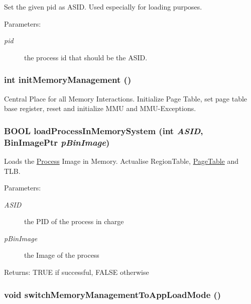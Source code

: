 Set the given pid as ASID. Used especially for loading purposes. \begin{Desc}
\item[Parameters:]
\begin{description}
\item[{\em pid}]the process id that should be the ASID. \end{description}
\end{Desc}
\hypertarget{group___v_m_m_g243fac608384b4b91246e465a206e72d}{
\subsubsection[{initMemoryManagement}]{\setlength{\rightskip}{0pt plus 5cm}int initMemoryManagement ()}}
\label{group___v_m_m_g243fac608384b4b91246e465a206e72d}


Central Place for all Memory Interactions. Initialize Page Table, set page table base register, reset and initialize MMU and MMU-Exceptions. \hypertarget{group___v_m_m_gfbd1dbe50bf30f665f1a4fc181655778}{
\subsubsection[{loadProcessInMemorySystem}]{\setlength{\rightskip}{0pt plus 5cm}BOOL loadProcessInMemorySystem (int {\em ASID}, \/  BinImagePtr {\em pBinImage})}}
\label{group___v_m_m_gfbd1dbe50bf30f665f1a4fc181655778}


Loads the \hyperlink{struct_process}{Process} Image in Memory. Actualise RegionTable, \hyperlink{struct_page_table}{PageTable} and TLB. \begin{Desc}
\item[Parameters:]
\begin{description}
\item[{\em ASID}]the PID of the process in charge \item[{\em pBinImage}]the Image of the process \end{description}
\end{Desc}
\begin{Desc}
\item[Returns:]TRUE if successful, FALSE otherwise \end{Desc}
\hypertarget{group___v_m_m_g95c733b81f5f912811660319f6dede57}{
\subsubsection[{switchMemoryManagementToAppLoadMode}]{\setlength{\rightskip}{0pt plus 5cm}void switchMemoryManagementToAppLoadMode ()}}
\label{group___v_m_m_g95c733b81f5f912811660319f6dede57}


